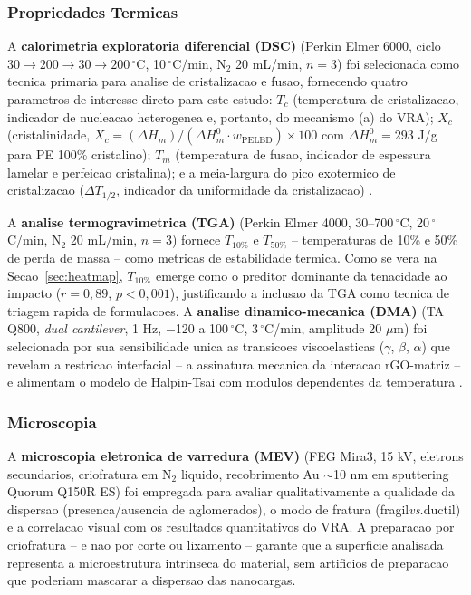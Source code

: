 \documentclass[11pt,a4paper,oneside]{article}
\begin{document}
\subsubsection{Propriedades Termicas}

A {\bfseries calorimetria exploratoria diferencial (DSC)} (Perkin Elmer 6000, ciclo
$30{\rightarrow}200{\rightarrow}30{\rightarrow}200\,^{\circ}$C, 10$\,^{\circ}$C/min, N$_2$
20 mL/min, $n{=}3$) foi selecionada como tecnica primaria para analise de cristalizacao e fusao,
fornecendo quatro parametros de interesse direto para este estudo: $T_c$ (temperatura de
cristalizacao, indicador de nucleacao heterogenea e, portanto, do mecanismo (a) do VRA);
$X_c$ (cristalinidade, $X_c{=}(\Delta H_m)/(\Delta H_m^0{\cdot}w_{\text{PELBD}}){\times}100$
com $\Delta H_m^0{=}293$ J/g para PE 100\% cristalino); $T_m$ (temperatura de fusao, indicador
de espessura lamelar e perfeicao cristalina); e a meia-largura do pico exotermico de
cristalizacao ($\Delta T_{1/2}$, indicador da uniformidade da cristalizacao) \cite{Coutinho2003}.

A {\bfseries analise termogravimetrica (TGA)} (Perkin Elmer 4000, 30--700$\,^{\circ}$C,
20$\,^{\circ}$C/min, N$_2$ 20 mL/min, $n{=}3$) fornece $T_{10\%}$ e $T_{50\%}$ -- temperaturas
de 10\% e 50\% de perda de massa -- como metricas de estabilidade termica. Como se vera na
Secao~\ref{sec:heatmap}, $T_{10\%}$ emerge como o preditor dominante da tenacidade ao impacto
($r{=}0{,}89$, $p{<}0{,}001$), justificando a inclusao da TGA como tecnica de triagem rapida
de formulacoes. A {\bfseries analise dinamico-mecanica (DMA)} (TA Q800, \textit{dual cantilever},
1 Hz, $-$120 a 100$\,^{\circ}$C, 3$\,^{\circ}$C/min, amplitude 20 $\mu$m) foi selecionada por
sua sensibilidade unica as transicoes viscoelasticas ($\gamma$, $\beta$, $\alpha$) que revelam
a restricao interfacial -- a assinatura mecanica da interacao rGO-matriz -- e alimentam o modelo
de Halpin-Tsai com modulos dependentes da temperatura \cite{Menard2020}.

\subsubsection{Microscopia}

A {\bfseries microscopia eletronica de varredura (MEV)} (FEG Mira3, 15 kV, eletrons secundarios,
criofratura em N$_2$ liquido, recobrimento Au ${\sim}$10 nm em sputtering Quorum Q150R ES) foi
empregada para avaliar qualitativamente a qualidade da dispersao (presenca/ausencia de
aglomerados), o modo de fratura (fragil\textit{vs.}ductil) e a correlacao visual com os resultados
quantitativos do VRA. A preparacao por criofratura -- e nao por corte ou lixamento -- garante
que a superficie analisada representa a microestrutura intrinseca do material, sem artificios
de preparacao que poderiam mascarar a dispersao das nanocargas.
\end{document}

